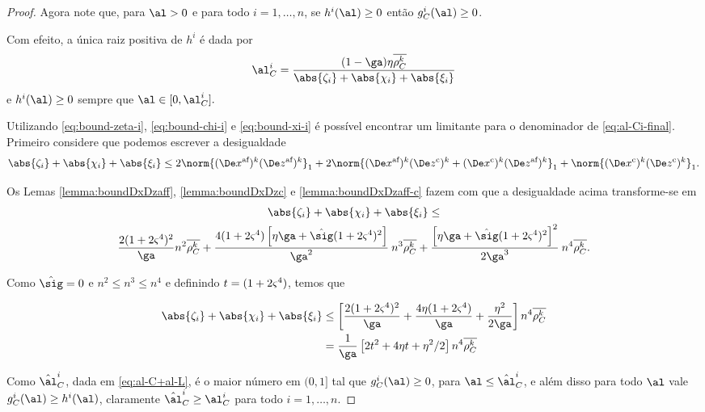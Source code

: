 \begin{proof}
Agora note que, para $\al>0$ e para todo $i=1,\ldots,n$, se $h^i(\al)\geq0$ então $g_C^i(\al)\geq 0$. 

Com efeito, a única raiz positiva de $h^i$ é dada por
\begin{equation}
	\label{eq:al-Ci-final}
	\al_{C}^i = \dfrac{(1-\ga)\eta\rhoCkb }{\abs{\zeta_i} + \abs{\chi_i} + \abs{\xi_i}}
\end{equation}
e $h^i(\al)\geq 0$ sempre que $\al\in[0,\al_{C}^i].$ 



Utilizando \eqref{eq:bound-zeta-i}, \eqref{eq:bound-chi-i} e \eqref{eq:bound-xi-i}  é possível encontrar um limitante para o denominador de \eqref{eq:al-Ci-final}. Primeiro considere que podemos escrever a  
desigualdade
\[
\abs{\zeta_i} + \abs{\chi_i} + \abs{\xi_i} \leq 2\norm{ \dekx  \dekz }_1 + 2 \norm{ \dekx \Dekcoz + \Dekcox \dekz }_1 + \norm{\Dekcox\Dekcoz}_1.
\]



Os Lemas \ref{lemma:boundDxDzaff},   \ref{lemma:boundDxDzc} e \ref{lemma:boundDxDzaff-c}  fazem com que a desigualdade acima transforme-se em 
\begin{multline*}
\abs{\zeta_i} + \abs{\chi_i} + \abs{\xi_i}  \leq \\  \frac{2(1 + 2\bdxzstar^{4})^{2} }{\ga} n^{2}\rhoCkb + 
												\dfrac{4(1+2\bdxzstar^{4})\left[\eta\ga + \nextsig(1+2\bdxzstar^{4})^{2}\right]}{\ga^{2}}\: n^{3}\rhoCkb + 	 \dfrac{\left[\eta\ga + \nextsig(1+2\bdxzstar^{4})^{2}\right]^{2}}{2\ga^{3}} \: n^{4}\rhoCkb.
\end{multline*}

Como $\nextsig = 0$ e $n^{2}\leq n^{3}\leq  n^{4}$ e definindo $t = (1 + 2\varsigma^{4})$, temos que 

	\begin{align}
	\abs{\zeta_i} + \abs{\chi_i} + \abs{\xi_i} & \leq \left[ \frac{2(1 + 2\bdxzstar^{4})^{2} }{\ga} + 												\dfrac{4\eta(1+2\bdxzstar^{4})}{\ga} +	 \dfrac{\eta^{2}}{2\ga} \right] n^{4}\rhoCkb \notag \\
										& =	\dfrac{1}{\ga}\left[ 2t^{2} + 4\eta t + \eta^{2}/2 \right] n^{4}\rhoCkb
										\label{eq:zeta+chi+xi}
	\end{align}

Como $\nextal^{i}_{C}$, dada em \eqref{eq:al-C+al-L}, é o maior número em $(0,1]$ tal que $g_{C}^{i}(\al)\geq 0$, para $\al\leq\nextal^{i}_{C}$, e além disso para todo $\al$ vale $g_{C}^{i}(\al) \geq h^{i}(\al)$, claramente $\nextal^{i}_{C} \geq  \al_{C}^i$ para todo $i=1,\ldots,n$.



\end{proof}
